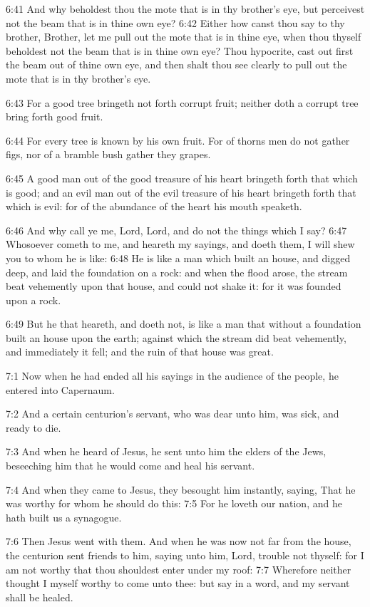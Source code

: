 6:41 And why beholdest thou the mote that is in thy brother's eye, but perceivest not the beam that is in thine own eye?  6:42 Either how canst thou say to thy brother, Brother, let me pull out the mote that is in thine eye, when thou thyself beholdest not the beam that is in thine own eye? Thou hypocrite, cast out first the beam out of thine own eye, and then shalt thou see clearly to pull out the mote that is in thy brother's eye.

6:43 For a good tree bringeth not forth corrupt fruit; neither doth a corrupt tree bring forth good fruit.

6:44 For every tree is known by his own fruit. For of thorns men do not gather figs, nor of a bramble bush gather they grapes.

6:45 A good man out of the good treasure of his heart bringeth forth that which is good; and an evil man out of the evil treasure of his heart bringeth forth that which is evil: for of the abundance of the heart his mouth speaketh.

6:46 And why call ye me, Lord, Lord, and do not the things which I say?  6:47 Whosoever cometh to me, and heareth my sayings, and doeth them, I will shew you to whom he is like: 6:48 He is like a man which built an house, and digged deep, and laid the foundation on a rock: and when the flood arose, the stream beat vehemently upon that house, and could not shake it: for it was founded upon a rock.

6:49 But he that heareth, and doeth not, is like a man that without a foundation built an house upon the earth; against which the stream did beat vehemently, and immediately it fell; and the ruin of that house was great.

7:1 Now when he had ended all his sayings in the audience of the people, he entered into Capernaum.

7:2 And a certain centurion's servant, who was dear unto him, was sick, and ready to die.

7:3 And when he heard of Jesus, he sent unto him the elders of the Jews, beseeching him that he would come and heal his servant.

7:4 And when they came to Jesus, they besought him instantly, saying, That he was worthy for whom he should do this: 7:5 For he loveth our nation, and he hath built us a synagogue.

7:6 Then Jesus went with them. And when he was now not far from the house, the centurion sent friends to him, saying unto him, Lord, trouble not thyself: for I am not worthy that thou shouldest enter under my roof: 7:7 Wherefore neither thought I myself worthy to come unto thee: but say in a word, and my servant shall be healed.


